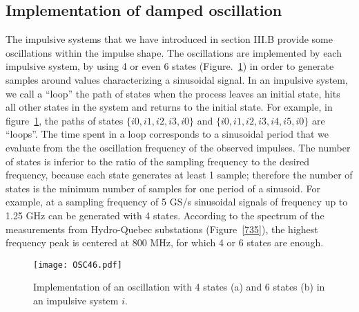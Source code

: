 \documentclass[journal]{IEEEtran}
\begin{document}
\subsection{Implementation of damped oscillation}
The impulsive systems that we have introduced in section III.B provide some oscillations within the impulse shape. The oscillations are implemented by each impulsive system, by using 4 or even 6 states (Figure.~\ref{OSC46}) in order to generate samples around values characterizing a sinusoidal signal. In an impulsive system, we call a ``loop'' the path of states when the process leaves an initial state, hits all other states in the system and returns to the initial state. For example, in figure~\ref{OSC46}, the paths of states $\{i0,i1,i2,i3,i0\}$ and $\{i0,i1,i2,i3,i4,i5,i0\}$ are ``loops''. The time spent in a loop corresponds to a sinusoidal period that we evaluate from the the oscillation frequency of the observed impulses. The number of states is inferior to the ratio of the sampling frequency to the desired frequency, because each state generates at least 1 sample; therefore the number of states is the minimum number of samples for one period of a sinusoid. For example, at a sampling frequency of 5 GS/s sinusoidal signals of frequency up to 1.25 GHz can be generated with 4 states. According to the spectrum of the measurements from Hydro-Quebec substations (Figure~\ref{735}), the highest frequency peak is centered at 800 MHz, for which 4 or 6 states are enough.
\begin{figure}
\texttt{[image: OSC46.pdf]}\\
  \caption{Implementation of an oscillation with 4 states (a) and 6 states (b) in an impulsive system $i$.}\label{OSC46}
\end{figure}
\end{document}
